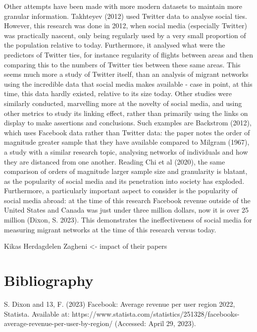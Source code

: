 \documentclass[12pt]{article}
\begin{document}
Other attempts have been made with more modern datasets to maintain more granular 
information. Takhteyev (2012) used Twitter data to analyse social ties. However, this 
research was done in 2012, when social media (especially Twitter) was practically 
nascent, only being regularly used by a very small proportion of the population 
relative to today. Furthermore, it analysed what were the predictors of Twitter ties, 
for instance regularity of flights between areas and then comparing this to the 
numbers of Twitter ties between these same areas. This seems much more a study 
of Twitter itself, than an analysis of migrant networks using the incredible data that 
social media makes available - case in point, at this time, this data hardly existed, 
relative to its size today. Other studies were similarly conducted, marvelling more 
at the novelty of social media, and using other metrics to study its linking effect, 
rather than primarily using the links on display to make assertions and conclusions. 
Such examples are Backstrom (2012), which uses Facebook data rather than Twitter data: 
the paper notes the order of magnitude greater sample that they have available compared 
to Milgram (1967), a study with a similar research topic, analysing networks of individuals 
and how they are distanced from one another. Reading Chi et al (2020), the same comparison 
of orders of magnitude larger sample size and granularity is blatant, as the popularity 
of social media and its penetration into society has exploded. Furthermore, a particularly  
important aspect to consider is the popularity of social media abroad: at the time of this 
research Facebook revenue outside of the United States and Canada was just under three
million dollars, now it is over 25 million (Dixon, S. 2023). This demonstrates the ineffectiveness of social 
media for measuring migrant networks at the time of this research versus today.

Kikas Herdagdelen Zagheni <- impact of their papers


\pagebreak 
\section{Bibliography}

S. Dixon and 13, F. (2023) Facebook: Average revenue per user region 2022, Statista. Available at: https://www.statista.com/statistics/251328/facebooks-average-revenue-per-user-by-region/ (Accessed: April 29, 2023). 
\end{document}
